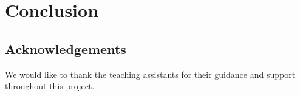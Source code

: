\chapter{Conclusion}

\section*{Acknowledgements}
We would like to thank the teaching assistants for their guidance and support throughout this project.
